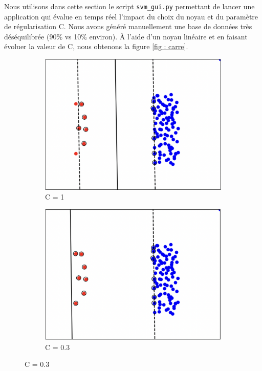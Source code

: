 \documentclass[a4paper,12pt]{article}
\begin{document}
Nous utilisons dans cette section le script \texttt{svm\_gui.py}  permettant de lancer une application qui évalue en temps réel l’impact du choix du noyau et du paramètre de régularisation C.
Nous avons généré manuellement une base de données très déséquilibrée (90\% vs 10\% environ). 
À l'aide d'un noyau linéaire et en faisant évoluer la valeur de C, nous obtenons la figure \ref{fig : carre}.


\begin{figure}[H]
    \centering
    \begin{subfigure}[b]{0.45\textwidth}
        \centering
        \includegraphics[width=\textwidth]{Images/C=1.png}
        \caption{C = 1}
    \end{subfigure}
    \hfill
    \begin{subfigure}[b]{0.45\textwidth}
        \centering
        \includegraphics[width=\textwidth]{Images/C=0.3.png}
        \caption{C = 0.3}
    \end{subfigure}


\end{figure}
\end{document}
